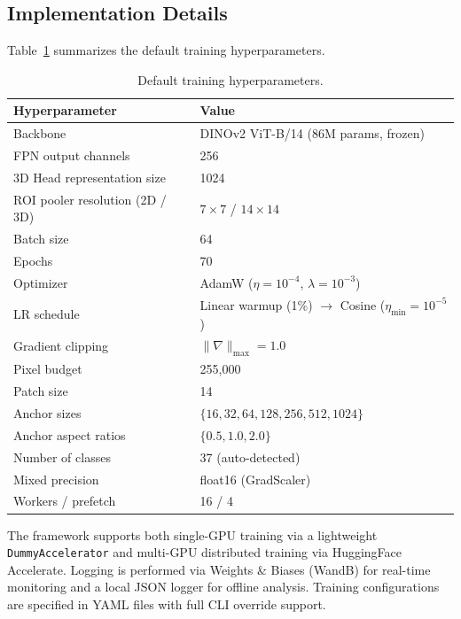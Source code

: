 \documentclass[runningheads]{llncs}
\begin{document}
\subsection{Implementation Details}
\label{sec:implementation_details}

Table~\ref{tab:hyperparams} summarizes the default training hyperparameters.

\begin{table}[t]
\centering
\caption{Default training hyperparameters.}
\label{tab:hyperparams}
\begin{tabular}{@{}ll@{}}
\toprule
\textbf{Hyperparameter} & \textbf{Value} \\
\midrule
Backbone & DINOv2 ViT-B/14 (86M params, frozen) \\
FPN output channels & 256 \\
3D Head representation size & 1024 \\
ROI pooler resolution (2D / 3D) & $7\times7$ / $14\times14$ \\
Batch size & 64 \\
Epochs & 70 \\
Optimizer & AdamW ($\eta=10^{-4}$, $\lambda=10^{-3}$) \\
LR schedule & Linear warmup (1\%) $\to$ Cosine ($\eta_{\min}=10^{-5}$) \\
Gradient clipping & $\|\nabla\|_{\max} = 1.0$ \\
Pixel budget & 255,000 \\
Patch size & 14 \\
Anchor sizes & $\{16, 32, 64, 128, 256, 512, 1024\}$ \\
Anchor aspect ratios & $\{0.5, 1.0, 2.0\}$ \\
Number of classes & 37 (auto-detected) \\
Mixed precision & float16 (GradScaler) \\
Workers / prefetch & 16 / 4 \\
\bottomrule
\end{tabular}
\end{table}

The framework supports both single-GPU training via a lightweight \texttt{DummyAccelerator} and multi-GPU distributed training via HuggingFace Accelerate.
Logging is performed via Weights \& Biases (WandB) for real-time monitoring and a local JSON logger for offline analysis.
Training configurations are specified in YAML files with full CLI override support.
\end{document}

